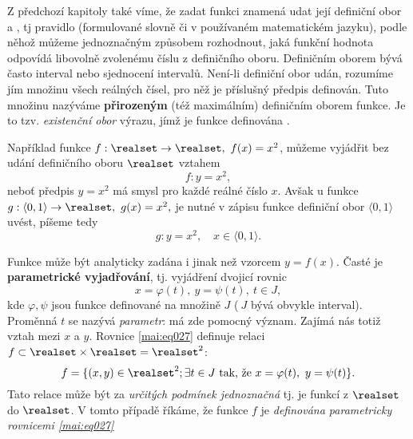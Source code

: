   
      Z předchozí kapitoly také víme, že zadat funkci znamená udat její definiční obor a 
      , tj pravidlo (formulované slovně či v používaném matematickém 
      jazyku), podle něhož můžeme jednoznačným způsobem rozhodnout, jaká funkční hodnota odpovídá 
      libovolně zvolenému číslu z definičního oboru. Definičním oborem bývá často interval nebo 
      sjednocení intervalů. Není-li definiční obor udán, rozumíme jím množinu všech reálných čísel, 
      pro něž je příslušný předpis definován. Tuto množinu nazýváme \textbf{přirozeným} (též 
      maximálním) definičním oborem funkce. Je to tzv. \emph{existenční obor} výrazu, jímž je 
      funkce definována \cite[s.~84]{Brabec1989}.
      
      Například funkce $f: \realset\rightarrow\realset,\ f(x)=x^2$, můžeme vyjádřit bez udání 
      definičního oboru \(\realset\) vztahem 
      \begin{equation*}
        f: y=x^2,
      \end{equation*}
      neboť předpis $y=x^2$ má smysl pro každé reálné číslo \(x\). Avšak u funkce $g:\langle0, 
      1\rangle\rightarrow\realset,\ g(x)=x^2,$ je nutné v zápisu funkce definiční obor $\langle0, 
      1\rangle$ 
      uvést, píšeme tedy   
      \begin{equation*}
        g: y=x^2, \quad x\in\langle0,1\rangle.
      \end{equation*}
       
        
      
        
      
      Funkce může být analyticky zadána i jinak než vzorcem $y=f(x)$. Časté je \textbf{parametrické 
      vyjadřování}, tj. vyjádření dvojicí rovnic 
      \begin{equation}\label{mai:eq027}
        x=\varphi(t),\ y=\psi(t),\ t\in J,
      \end{equation}
      kde $\varphi, \psi$ jsou funkce definované na množině $J$ ($\ J$ bývá obvykle interval). 
      Proměnná $t$ se nazývá \emph{parametr}: má zde pomocný význam. Zajímá nás totiž vztah mezi 
      \(x\) a \(y\). Rovnice \ref{mai:eq027} definuje relaci 
      $f\subset\realset\times\realset=\realset^2$:
      \begin{equation*}
        f = \{(x,y)\in\realset^2; \exists t\in J \text{ tak, že } x=\varphi(t),\ y=\psi(t)\}.
      \end{equation*}      
      Tato relace může být za \emph{určitých podmínek jednoznačná} tj. je funkcí z \(\realset\) do 
      \(\realset\). V tomto případě říkáme, že funkce $f$ je \emph{definována parametricky rovnicemi 
      \ref{mai:eq027}}
      
